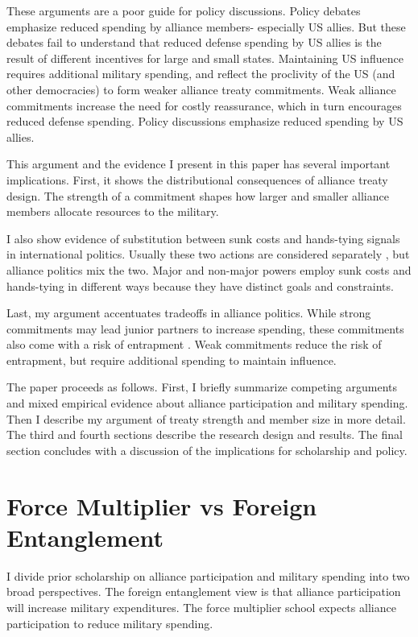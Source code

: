 \documentclass[12pt]{article}
\begin{document}
These arguments are a poor guide for policy discussions. 
Policy debates emphasize reduced spending by alliance members- especially US allies. 
But these debates fail to understand that reduced defense spending by US allies is the result of different incentives for large and small states. 
Maintaining US influence requires additional military spending, and reflect the proclivity of the US (and other democracies) to form weaker alliance treaty commitments. 
Weak alliance commitments increase the need for costly reassurance, which in turn encourages reduced defense spending. 
Policy discussions emphasize reduced spending by US allies.  


This argument and the evidence I present in this paper has several important implications. 
First, it shows the distributional consequences of alliance treaty design. 
The strength of a commitment shapes how larger and smaller alliance members allocate resources to the military. 


I also show evidence of substitution between sunk costs and hands-tying signals in international politics. 
Usually these two actions are considered separately \citep{Fearon1997, FuhrmannSechser2014}, but alliance politics mix the two. 
Major and non-major powers employ sunk costs and hands-tying in different ways because they have distinct goals and constraints. 


Last, my argument accentuates tradeoffs in alliance politics.
While strong commitments may lead junior partners to increase spending, these commitments also come with a risk of entrapment \citep{Benson2012}.
Weak commitments reduce the risk of entrapment, but require additional spending to maintain influence.


The paper proceeds as follows. 
First, I briefly summarize competing arguments and mixed empirical evidence about alliance participation and military spending. 
Then I describe my argument of treaty strength and member size in more detail. 
The third and fourth sections describe the research design and results. 
The final section concludes with a discussion of the implications for scholarship and policy.  


\section{Force Multiplier vs Foreign Entanglement}


I divide prior scholarship on alliance participation and military spending into two broad perspectives. 
The foreign entanglement view is that alliance participation will increase military expenditures.
The force multiplier school expects alliance participation to reduce military spending. 
\end{document}
